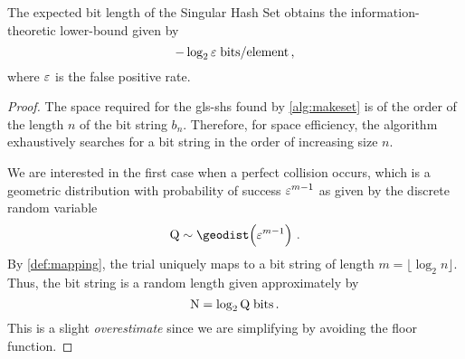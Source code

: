 \documentclass[ ../main.tex]{subfiles}
\begin{document}
\begin{theorem}
The expected bit length of the Singular Hash Set obtains the information-theoretic lower-bound given by
\begin{equation}
    -\log_2 \fprate \; \si{bits \per element}\,,
\end{equation}
where $\fprate$ is the false positive rate.
\end{theorem}
\begin{proof}
The space required for the \gls{gls-shs} found by \cref{alg:makeset} is of the order of the length $n$ of the bit string $b_n$. Therefore, for space efficiency, the algorithm exhaustively searches for a bit string in the order of increasing size $n$.

We are interested in the first case when a perfect collision occurs, which is a geometric distribution with probability of success $\fprate^{m-1}$ as given by the discrete random variable
\begin{equation}
    \RV{Q} \sim \geodist \!\left(\fprate^{m-1}\right)\,.
\end{equation}
By \cref{def:mapping}, the \nth trial uniquely maps to a bit string of length $m = \lfloor \log_2 n \rfloor$. Thus, the bit string is a random length given approximately by
\begin{equation}
    \RV{N} = \log_2 \RV{Q} \; \si{bits}\,.
\end{equation}
This is a slight \emph{overestimate} since we are simplifying by avoiding the floor function.


\end{proof}
\end{document}
